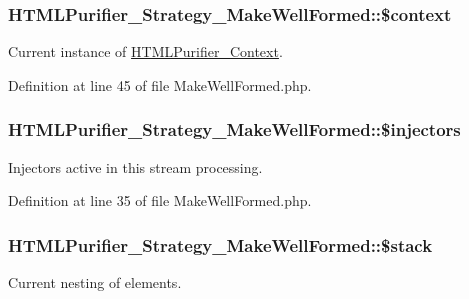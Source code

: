 \hypertarget{classHTMLPurifier__Strategy__MakeWellFormed_a2183f02d99e6db551da2a8aa2f53a26f}{
\subsubsection[{\$context}]{\setlength{\rightskip}{0pt plus 5cm}H\+T\+M\+L\+Purifier\+\_\+\+Strategy\+\_\+\+Make\+Well\+Formed\+::\$context\hspace{0.3cm}{\ttfamily [protected]}}}\label{classHTMLPurifier__Strategy__MakeWellFormed_a2183f02d99e6db551da2a8aa2f53a26f}
Current instance of \hyperlink{classHTMLPurifier__Context}{H\+T\+M\+L\+Purifier\+\_\+\+Context}. 

Definition at line 45 of file Make\+Well\+Formed.\+php.

\hypertarget{classHTMLPurifier__Strategy__MakeWellFormed_a8f24bfd1c7814eabfcfe377b671fef55}{
\subsubsection[{\$injectors}]{\setlength{\rightskip}{0pt plus 5cm}H\+T\+M\+L\+Purifier\+\_\+\+Strategy\+\_\+\+Make\+Well\+Formed\+::\$injectors\hspace{0.3cm}{\ttfamily [protected]}}}\label{classHTMLPurifier__Strategy__MakeWellFormed_a8f24bfd1c7814eabfcfe377b671fef55}
Injectors active in this stream processing. 

Definition at line 35 of file Make\+Well\+Formed.\+php.

\hypertarget{classHTMLPurifier__Strategy__MakeWellFormed_a42b5206c0b08d3713224da362e3893b1}{
\subsubsection[{\$stack}]{\setlength{\rightskip}{0pt plus 5cm}H\+T\+M\+L\+Purifier\+\_\+\+Strategy\+\_\+\+Make\+Well\+Formed\+::\$stack\hspace{0.3cm}{\ttfamily [protected]}}}\label{classHTMLPurifier__Strategy__MakeWellFormed_a42b5206c0b08d3713224da362e3893b1}
Current nesting of elements. 

